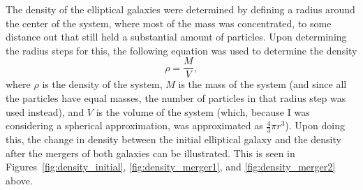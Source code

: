 \documentclass[12pt]{report}
\begin{document}
\begin{figure}[H]
\end{figure}


The density of the elliptical galaxies were determined by defining a radius around the center of the system, where most of the mass was concentrated, to some distance out that still held a substantial amount of particles. Upon determining the radius steps for this, the following equation was used to determine the density
\begin{equation}\label{eqn:density_eqn}
    \rho = \frac{M}{V},
\end{equation}
where $\rho$ is the density of the system, $M$ is the mass of the system (and since all the particles have equal masses, the number of particles in that radius step was used instead), and $V$ is the volume of the system (which, because I was considering a spherical approximation, was approximated as $\frac{4}{3}\pi r^3$). Upon doing this, the change in density between the initial elliptical galaxy and the density after the mergers of both galaxies can be illustrated. This is seen in Figures~\ref{fig:density_initial}, \ref{fig:density_merger1}, and \ref{fig:density_merger2} above.
\end{document}
